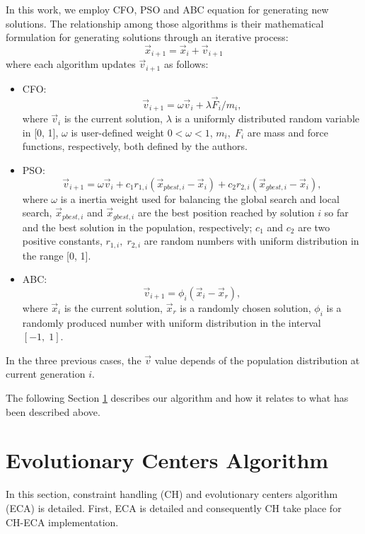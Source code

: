 \documentclass[conference]{IEEEtran}
\begin{document}
In this work, we employ CFO, PSO and ABC equation for generating new solutions. The relationship among those algorithms is their mathematical formulation for generating solutions through an iterative process:
%
\begin{equation}
	\vec{x}_{i + 1} = \vec{x}_{i} + \vec{v}_{i + 1}
	\label{eqn:xxv}
\end{equation}
%
where each algorithm updates $\vec{v}_{i+1} $ as follows:
\begin{itemize}
	\item CFO: $$
		\vec{v}_{i + 1} = \omega \vec{v}_{i} + {\lambda \vec{F}_{i}} / {m_i},
		$$
		where $\vec{v}_{i}$ is the current solution, $\lambda$ is a uniformly 
		distributed random variable in [0, 1], $\omega$ 
		is user-defined weight $0 < \omega < 1$, $m_i,\; F_i$ are mass and force 
		functions, respectively, both defined by the authors.
	\item PSO:
		$$
			\vec{v}_{i + 1} = \omega \vec{v}_{i} +  
					c_1 r_{1, i} ( \vec{x}_{pbest, i} - \vec{x}_i ) + 
					c_2 r_{2, i} ( \vec{x}_{gbest, i} - \vec{x}_i ),
		$$
		where $\omega$ is a inertia weight used for balancing the global search 
		and local search, $\vec{x}_{pbest, i}$ and $\vec{x}_{gbest, i}$ are the 
		best position reached by solution $i$ so far and the best solution in the 
		population, respectively; $c_1$ and $c_2$ are two positive constants, $r_{1, i},\; r_{2, i}$ 
		are random numbers with uniform distribution in the range [0, 1].
	\item ABC:
		$$
			\vec{v}_{i + 1} = \phi_i (\vec{x}_i - \vec{x}_{r}),
		$$
	where $\vec{x}_i$ is the current solution, $\vec{x}_r$ is a randomly chosen 
	solution, $\phi_i$ is a randomly produced number with uniform distribution 
	in the interval $[-1,\;1]$.
\end{itemize}
%
%
In the three previous cases, the $\vec{v}$ value  depends of the population 
distribution at current generation $i$.

The following Section \ref{sec:eca} describes our algorithm and how it 
relates to what has been  described above. 


\section{Evolutionary Centers Algorithm} %
\label{sec:eca}

In this section, constraint handling (CH) and evolutionary centers algorithm (ECA) is detailed. First, ECA is detailed and consequently CH take place for CH-ECA implementation.\\
\end{document}
